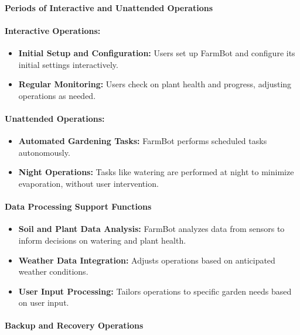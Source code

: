 \paragraph{Periods of Interactive and Unattended Operations}

\paragraph{Interactive Operations:}
\begin{itemize}
    \item \textbf{Initial Setup and Configuration:} Users set up FarmBot and configure its initial settings interactively.
    \item \textbf{Regular Monitoring:} Users check on plant health and progress, adjusting operations as needed.
\end{itemize}

\paragraph{Unattended Operations:}
\begin{itemize}
    \item \textbf{Automated Gardening Tasks:} FarmBot performs scheduled tasks autonomously.
    \item \textbf{Night Operations:} Tasks like watering are performed at night to minimize evaporation, without user intervention.
\end{itemize}

\paragraph{Data Processing Support Functions}

\begin{itemize}
    \item \textbf{Soil and Plant Data Analysis:} FarmBot analyzes data from sensors to inform decisions on watering and plant health.
    \item \textbf{Weather Data Integration:} Adjusts operations based on anticipated weather conditions.
    \item \textbf{User Input Processing:} Tailors operations to specific garden needs based on user input.
\end{itemize}

\paragraph{Backup and Recovery Operations}

